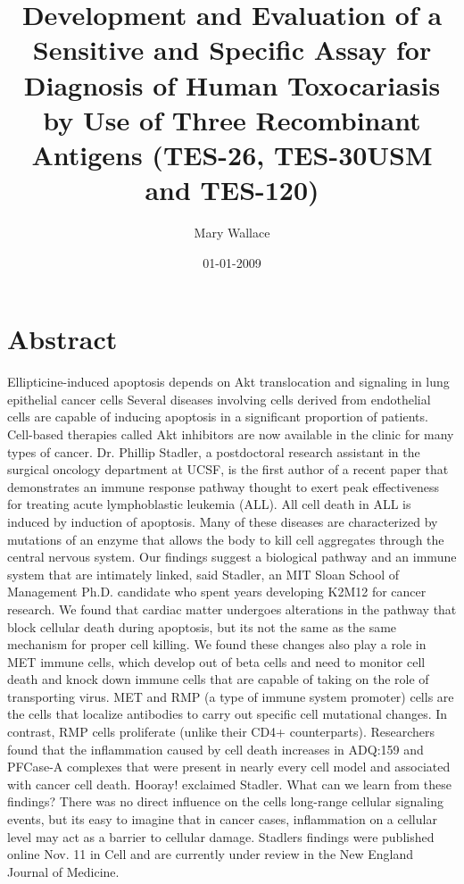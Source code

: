 \documentclass{article}%
\title{Development and Evaluation of a Sensitive and Specific Assay for Diagnosis of Human Toxocariasis by Use of Three Recombinant Antigens (TES{-}26, TES{-}30USM and TES{-}120)}%
\author{Mary Wallace}%
\affil{Institute of Neurological Sciences and Psychiatry, Hacettepe University, Ankara 06100, Turkey.}%
\date{01{-}01{-}2009}%
\begin{document}
%
\normalsize%
\maketitle%
\section{Abstract}%
\label{sec:Abstract}%
Ellipticine{-}induced apoptosis depends on Akt translocation and signaling in lung epithelial cancer cells\newline%
Several diseases involving cells derived from endothelial cells are capable of inducing apoptosis in a significant proportion of patients. Cell{-}based therapies called Akt inhibitors are now available in the clinic for many types of cancer.\newline%
Dr. Phillip Stadler, a postdoctoral research assistant in the surgical oncology department at UCSF, is the first author of a recent paper that demonstrates an immune response pathway thought to exert peak effectiveness for treating acute lymphoblastic leukemia (ALL).\newline%
All cell death in ALL is induced by induction of apoptosis. Many of these diseases are characterized by mutations of an enzyme that allows the body to kill cell aggregates through the central nervous system.\newline%
Our findings suggest a biological pathway and an immune system that are intimately linked, said Stadler, an MIT Sloan School of Management Ph.D. candidate who spent years developing K2M12 for cancer research. We found that cardiac matter undergoes alterations in the pathway that block cellular death during apoptosis, but its not the same as the same mechanism for proper cell killing. We found these changes also play a role in MET immune cells, which develop out of beta cells and need to monitor cell death and knock down immune cells that are capable of taking on the role of transporting virus.\newline%
MET and RMP (a type of immune system promoter) cells are the cells that localize antibodies to carry out specific cell mutational changes. In contrast, RMP cells proliferate (unlike their CD4+ counterparts).\newline%
Researchers found that the inflammation caused by cell death increases in ADQ:159 and PFCase{-}A complexes that were present in nearly every cell model and associated with cancer cell death.\newline%
Hooray! exclaimed Stadler. What can we learn from these findings? There was no direct influence on the cells long{-}range cellular signaling events, but its easy to imagine that in cancer cases, inflammation on a cellular level may act as a barrier to cellular damage.\newline%
Stadlers findings were published online Nov. 11 in Cell and are currently under review in the New England Journal of Medicine.
\end{document}
